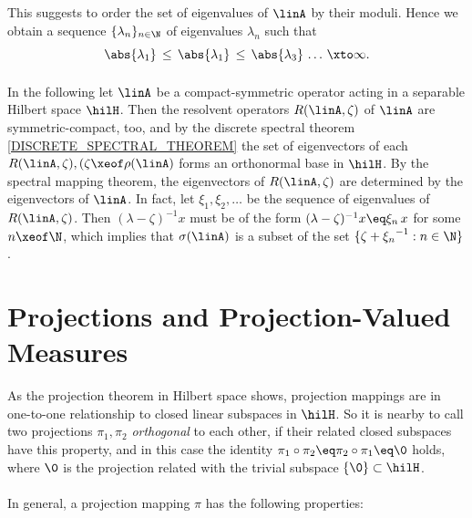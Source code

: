 \documentclass[11pt,twoside]{article}
\begin{document}
\subparagraph{}
This suggests to order the set of eigenvalues of $\linA$ by their moduli.
Hence we obtain a sequence $\{\lambda_n\}_{n \in \N}$
of eigenvalues $\lambda_n$
such that
\[
\abs{\lambda_1} \, \leq \, \abs{\lambda_1} \, \leq \, \abs{\lambda_3} \, \dots
\, \xto \infty.
\]

\paragraph{} %
In the following 
let $\linA$ be a {compact-symmetric} operator
acting in a separable Hilbert space $\hilH$.
Then the resolvent operators $R(\linA,\zeta)$ of $\linA$ are symmetric-compact,
too,
and by the discrete spectral theorem \ref{DISCRETE_SPECTRAL_THEOREM} 
the set of eigenvectors of each $R(\linA,\zeta), (\zeta \xeof \rho(\linA)$
forms an orthonormal base in $\hilH$.
By the spectral mapping theorem,
the eigenvectors of $R(\linA,\zeta)$ are determined
by the eigenvectors of $\linA$.
In fact,
let $\xi_1,\xi_2,\ldots$ be the sequence of eigenvalues of $R(\linA,\zeta)$.
Then $(\lambda - \zeta)^{-1}x$ must be of the form
$(\lambda - \zeta)^{-1} x  \eq \xi_n \, x$ for some $n \xeof \N$,
which implies that $\sigma(\linA)$ is a subset of the set
$\{\zeta + {\xi_n}^{-1}: n \in \N \}$.

\section{Projections and Projection-Valued Measures}
As the projection theorem in Hilbert space shows,
projection mappings
are in one-to-one relationship to closed linear subspaces in $\hilH$.
So it is nearby
to call two projections $\pi_1,\pi_2$ \textit{orthogonal} to each other,
if their related closed subspaces have this property,
and in this case the identity
$\pi_1 \circ \pi_2 \eq \pi_2 \circ \pi_1 \eq \0$ holds,
where $\0$ is the projection related
with the trivial subspace $\{\0\} \subset \hilH$.

\paragraph{} %
In general,
a projection mapping $\pi$ has the following properties:
\end{document}
